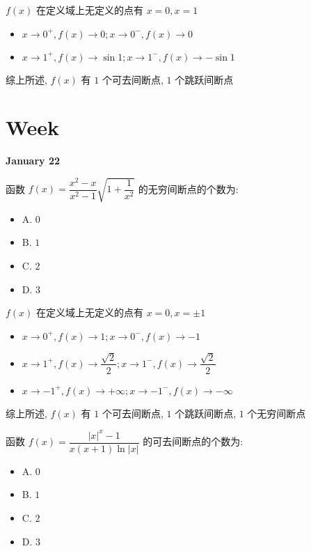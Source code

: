 \begin{solution}

	$f(x)$ 在定义域上无定义的点有 $x=0, x=1$
	\begin{itemize}
		\item $x\to 0^{+}, f(x)\to 0 ; x\to 0^{-}, f(x)\to 0$
		\item $x\to 1^{+}, f(x)\to \sin 1 ; x\to 1^{-}, f(x)\to -\sin 1$
	\end{itemize}

	综上所述, $f(x)$ 有 $1$ 个可去间断点, $1$ 个跳跃间断点
\end{solution}


\section{Week }
\textcolor{purplea}{\textbf{January 22}}

\begin{example}[][Exam: 27.4.1]
	函数 $f(x)=\dfrac{x^{2}-x}{x^{2}-1}\sqrt{1+\dfrac{1}{x^{2}}}$ 的无穷间断点的个数为:
\begin{itemize}
	\item A. $0$
	\item B. $1$
	\item C. $2$
	\item D. $3$
\end{itemize}
\end{example}

\begin{solution}

	$f(x)$ 在定义域上无定义的点有 $x=0, x=\pm 1$
	\begin{itemize}
		\item $x\to 0^{+}, f(x)\to 1 ; x\to 0^{-}, f(x)\to -1$
		\item $x\to 1^{+}, f(x)\to \dfrac{\sqrt{2}}{2} ; x\to 1^{-}, f(x)\to \dfrac{\sqrt{2}}{2}$
		\item $x\to -1^{+}, f(x)\to +\infty ; x\to -1^{-}, f(x)\to -\infty$
	\end{itemize}

	综上所述, $f(x)$ 有 $1$ 个可去间断点, $1$ 个跳跃间断点, $1$ 个无穷间断点
\end{solution}

\begin{example}[][Exam: 27.4.2]
	函数 $f(x)=\dfrac{|x|^{x}-1}{x(x+1)\ln|x|}$ 的可去间断点的个数为:
\begin{itemize}
	\item A. $0$
	\item B. $1$
	\item C. $2$
	\item D. $3$
\end{itemize}
\end{example}

